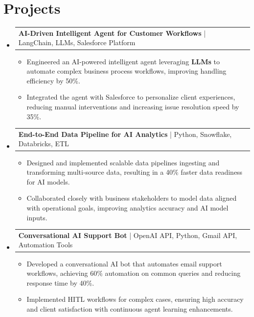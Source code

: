 \documentclass[letterpaper,11pt]{article}
\makeatletter
\newcommand{\resumeItem}[1]{
  \item\footnotesize{
    {#1 \vspace{-2pt}}
  }
}
\newcommand{\resumeProjectHeading}[2]{
    \item
    \begin{tabular*}{1.001\textwidth}{l@{\extracolsep{\fill}}r}
      \small#1 & \textbf{\small #2}\\
    \end{tabular*}\vspace{-7pt}
}
\newcommand{\resumeSubHeadingListStart}{\begin{itemize}[leftmargin=0pt, label={}]}
\newcommand{\resumeSubHeadingListEnd}{\end{itemize}}
\newcommand{\resumeItemListStart}{\begin{itemize}[leftmargin=*]}
\newcommand{\resumeItemListEnd}{\end{itemize}\vspace{-5pt}}
\makeatother
\begin{document}
\section{Projects}
    \vspace{-5pt}
    \resumeSubHeadingListStart
      \resumeProjectHeading
          {\textbf{AI-Driven Intelligent Agent for Customer Workflows} | LangChain, LLMs, Salesforce Platform}{}
          \resumeItemListStart
              \resumeItem{Engineered an AI-powered intelligent agent leveraging \textbf{LLMs} to automate complex business process workflows, improving handling efficiency by 50\%.}
              \resumeItem{Integrated the agent with Salesforce to personalize client experiences, reducing manual interventions and increasing issue resolution speed by 35\%.}
          \resumeItemListEnd
          \vspace{-12pt}
      \resumeProjectHeading
          {\textbf{End-to-End Data Pipeline for AI Analytics} | Python, Snowflake, Databricks, ETL}{}
          \resumeItemListStart
              \resumeItem{Designed and implemented scalable data pipelines ingesting and transforming multi-source data, resulting in a 40\% faster data readiness for AI models.}
              \resumeItem{Collaborated closely with business stakeholders to model data aligned with operational goals, improving analytics accuracy and AI model inputs.}
          \resumeItemListEnd
          \vspace{-12pt}
      \resumeProjectHeading
          {\textbf{Conversational AI Support Bot} | OpenAI API, Python, Gmail API, Automation Tools}{}
          \resumeItemListStart
              \resumeItem{Developed a conversational AI bot that automates email support workflows, achieving 60\% automation on common queries and reducing response time by 40\%.}
              \resumeItem{Implemented HITL workflows for complex cases, ensuring high accuracy and client satisfaction with continuous agent learning enhancements.}
          \resumeItemListEnd
    \resumeSubHeadingListEnd
\end{document}
